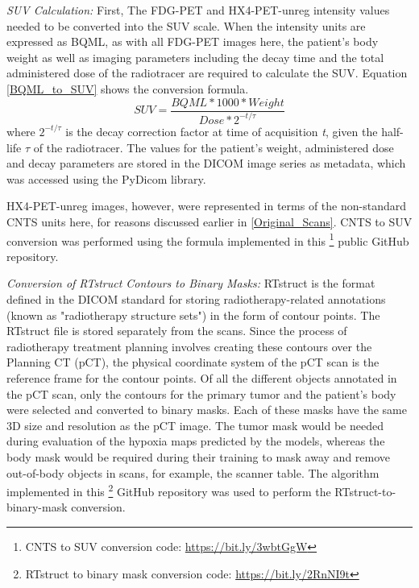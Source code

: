\vspace{4mm}
\noindent
\textit{SUV Calculation:} First, The FDG-PET and HX4-PET-unreg intensity values needed to be converted into the SUV scale. When the intensity units are expressed as BQML, as with all FDG-PET images here, the patient's body weight as well as imaging parameters including the decay time and the total administered dose of the radiotracer are required to calculate the SUV. Equation \ref{BQML_to_SUV} shows the conversion formula. 
\begin{equation}
    SUV = \frac{BQML * 1000 * Weight}{Dose * 2^{-t/\tau}} 
    \label{BQML_to_SUV}
\end{equation}
where $2^{-t/\tau}$ is the decay correction factor at time of acquisition \textit{t}, given the half-life $\tau$ of the radiotracer. The values for the patient's weight, administered dose and decay parameters are stored in the DICOM image series as metadata, which was accessed using the PyDicom library. 

HX4-PET-unreg images, however, were represented in terms of the non-standard CNTS units here, for reasons discussed earlier in \ref{Original_Scans}. CNTS to SUV conversion was performed using the formula implemented in this \footnote{CNTS to SUV conversion code: \url{https://bit.ly/3wbtGgW}} public GitHub repository.

\vspace{4mm}
\noindent
\textit{Conversion of RTstruct Contours to Binary Masks:} RTstruct is the format defined in the DICOM standard for storing radiotherapy-related annotations (known as "radiotherapy structure sets") in the form of contour points. The RTstruct file is stored separately from the scans. Since the process of radiotherapy treatment planning involves creating these contours over the Planning CT (pCT), the physical coordinate system of the pCT scan is the reference frame for the contour points. Of all the different objects annotated in the pCT scan, only the contours for the primary tumor and the patient's body were selected and converted to binary masks. Each of these masks have the same 3D size and resolution as the pCT image. The tumor mask would be needed during evaluation of the hypoxia maps predicted by the models, whereas the body mask would be required during their training to mask away and remove out-of-body objects in scans, for example, the scanner table. The algorithm implemented in this \footnote{RTstruct to binary mask conversion code: \url{https://bit.ly/2RnNI9t}} GitHub repository was used to perform the RTstruct-to-binary-mask conversion.

